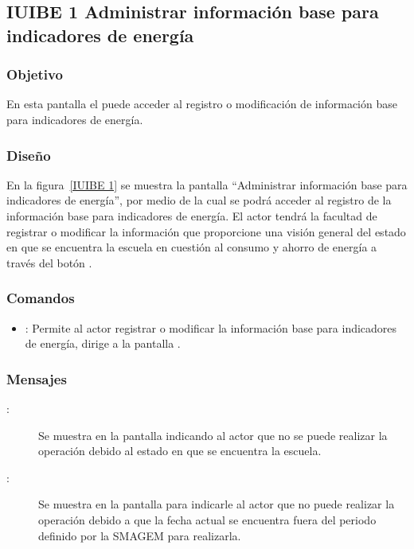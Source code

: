 \subsection{IUIBE 1 Administrar información base para indicadores de energía}

\subsubsection{Objetivo}
	
    En esta pantalla el  puede acceder al registro o modificación de información base para indicadores de energía.

\subsubsection{Diseño}

    En la figura~\ref{IUIBE 1} se muestra la pantalla ``Administrar información base para indicadores de energía'', por medio de la cual se podrá acceder al registro de la información base para indicadores de energía. El actor tendrá la facultad de registrar o modificar la información que proporcione una visión general del estado en que se encuentra la escuela en cuestión al consumo y ahorro de energía  a través del botón \botEdit.  



\subsubsection{Comandos}
    \begin{itemize}
	\item {}: Permite al actor registrar o modificar la información base para indicadores de energía, dirige a la pantalla . 
    \end{itemize}

\subsubsection{Mensajes}

    \begin{description}
	\item[:] Se muestra en la pantalla  indicando al actor que no se puede realizar la operación debido al estado en que se encuentra la escuela.
	
	\item [:] Se muestra en la pantalla  para indicarle al actor que no puede realizar la operación debido a que la fecha actual se encuentra fuera del periodo definido por la SMAGEM para realizarla.
    \end{description}
